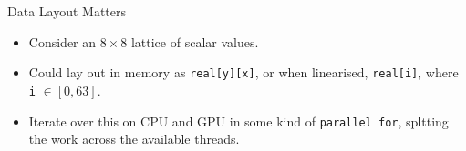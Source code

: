 \begin{frame}{Data Layout Matters}
  \begin{itemize}
    \item Consider an $8 \times 8$ lattice of scalar values.
    \vspace{0.1cm}
    \item Could lay out in memory as \texttt{real[y][x]}, or when linearised, \texttt{real[i]}, where \texttt{i} $\in [0,63]$.
    \vspace{0.1cm}
    \item Iterate over this on CPU and GPU in some kind of \texttt{parallel for}, spltting the work across the available threads.
  \end{itemize}
  \begin{columns}
\end{columns}
\end{frame}
